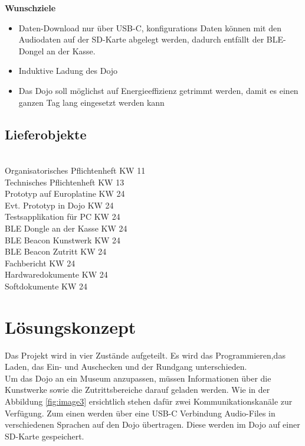 \documentclass[10pt,a4paper,oneside]{99_fhnwreport}
\begin{document}
\textbf{Wunschziele}
\begin{itemize}
\item{Daten-Download nur über USB-C, konfigurations Daten können mit den Audiodaten auf der SD-Karte abgelegt werden, dadurch entfällt der BLE-Dongel an der Kasse.}
\item{Induktive Ladung des Dojo}
\item{Das Dojo soll möglichst auf Energieeffizienz getrimmt werden, damit es einen ganzen Tag lang eingesetzt werden kann}
\end{itemize}

\subsection{Lieferobjekte}

\begin{tabbing}
\hspace{80mm}		\= 	\\ %
Organisatorisches Pflichtenheft		\>	KW 11 \\
Technisches Pflichtenheft		\>	KW 13 \\
Prototyp auf Europlatine		\>	KW 24 \\
Evt. Prototyp in Dojo			\>	KW 24 \\
Testsapplikation für PC			\>	KW 24 \\
BLE Dongle  an der Kasse			\>	KW 24 \\
BLE Beacon Kunstwerk			\>	KW 24 \\
BLE Beacon Zutritt			\>	KW 24 \\
Fachbericht				\>	KW 24 \\
Hardwaredokumente			\>	KW 24 \\
Softdokumente				\>	KW 24 \\
\end{tabbing}

\section{Lösungskonzept}\label{sec:konzept}

Das Projekt wird in vier Zustände aufgeteilt. Es wird das Programmieren,das Laden, das Ein- und Auschecken und der Rundgang unterschieden.\\
Um das Dojo an ein Museum anzupassen, müssen Informationen über die Kunstwerke sowie die Zutrittsbereiche darauf geladen werden. Wie in der Abbildung \ref{fig:image3} ersichtlich stehen dafür zwei Kommunikationskanäle zur Verfügung. Zum einen werden über eine USB-C Verbindung Audio-Files in verschiedenen Sprachen auf den Dojo übertragen. Diese werden im Dojo auf einer SD-Karte gespeichert.\\
\end{document}
